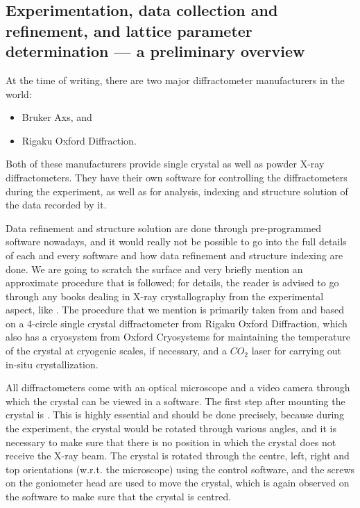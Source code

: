 \subsection{Experimentation, data collection and refinement, and lattice parameter determination --- a preliminary overview}

At the time of writing, there are two major diffractometer manufacturers in the world:%
%	
	\begin{itemize}%
%	
	    \item Bruker Axs, and
	    
	    \item Rigaku Oxford Diffraction.
	    
	\end{itemize}
	
Both of these manufacturers provide single crystal as well as powder X-ray diffractometers. They have their own software for controlling the diffractometers during the experiment, as well as for analysis, indexing and structure solution of the data recorded by it.

Data refinement and structure solution are done through pre-programmed software nowadays, and it would really not be possible to go into the full details of each and every software and how data refinement and structure indexing are done. We are going to scratch the surface and very briefly mention an approximate procedure that is followed; for details, the reader is advised to go through any books dealing in X-ray crystallography from the experimental aspect, like \cite{Cullity2014}. The procedure that we mention is primarily taken from \cite{Chowdhury2022} and based on a 4-circle single crystal diffractometer from Rigaku Oxford Diffraction, which also has a cryosystem from Oxford Cryosystems for maintaining the temperature of the crystal at cryogenic scales, if necessary, and a $CO_2$ laser for carrying out in-situ crystallization.

All diffractometers come with an optical microscope and a video camera through which the crystal can be viewed in a software. The first step after mounting the crystal is . This is highly essential and should be done precisely, because during the experiment, the crystal would be rotated through various angles, and it is necessary to make sure that there is no position in which the crystal does not receive the X-ray beam. The crystal is rotated through the centre, left, right and top orientations (w.r.t. the microscope) using the control software, and the screws on the goniometer head are used to move the crystal, which is again observed on the software to make sure that the crystal is centred.

